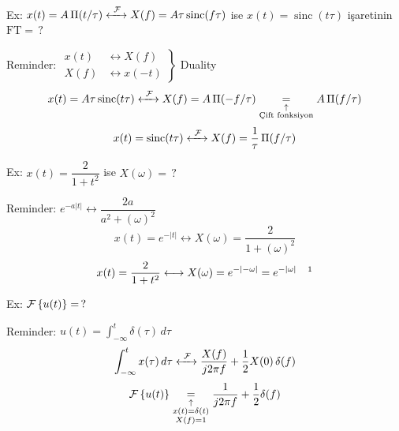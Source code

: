 \documentclass[11pt,a4paper]{article}
\begin{document}
\begin{ornek}
Ex: $x(t)=A\,\Pi(t/\tau) \xleftrightarrow{\ \mathcal{F}\ } X(f)=A\tau\operatorname{sinc}(f\tau)$ ise $x(t)=\operatorname{sinc}(t\tau)$ işaretinin $\text{FT}=\,?$
\end{ornek}
Reminder: \quad $\left.\begin{aligned} x(t)&\longleftrightarrow X(f)\\ X(f)&\longleftrightarrow x(-t)\end{aligned}\right\}$ Duality
\[ x(t)=A\tau\operatorname{sinc}(t\tau) \xleftrightarrow{\ \mathcal{F}\ } X(f)=A\,\Pi(-f/\tau)\underset{\substack{\uparrow\\ \text{Çift fonksiyon}}}{=}A\,\Pi(f/\tau) \]
\[ x(t)=\operatorname{sinc}(t\tau) \xleftrightarrow{\ \mathcal{F}\ } X(f)=\frac{1}{\tau}\,\Pi(f/\tau) \]

\begin{ornek}
Ex: $x(t)=\dfrac{2}{1+t^2}$ ise $X(\omega)=\,?$
\end{ornek}
Reminder: \quad $e^{-a|t|} \longleftrightarrow \dfrac{2a}{a^2+(\omega)^2}$
\[ x(t)=e^{-|t|} \longleftrightarrow X(\omega)=\frac{2}{1+(\omega)^2} \]
\[ x(t)=\frac{2}{1+t^2} \longleftrightarrow X(\omega)=e^{-|-\omega|}=e^{-|\omega|}\quad\text{\footnotemark} \]

\begin{ornek}
Ex: $\mathcal{F}\left\{u(t)\right\}=\,?$
\end{ornek}
Reminder: \quad $u(t)=\displaystyle\int_{-\infty}^{t}\delta(\tau)\,d\tau$
\[ \int_{-\infty}^{t} x(\tau)\,d\tau \xleftrightarrow{\ \mathcal{F}\ } \frac{X(f)}{j2\pi f}+\frac{1}{2}X(0)\,\delta(f) \]
\[ \mathcal{F}\left\{u(t)\right\}\underset{\substack{\uparrow\\ x(t)=\delta(t)\\ X(f)=1}}{=}\frac{1}{j2\pi f}+\frac{1}{2}\delta(f) \]
\end{document}
